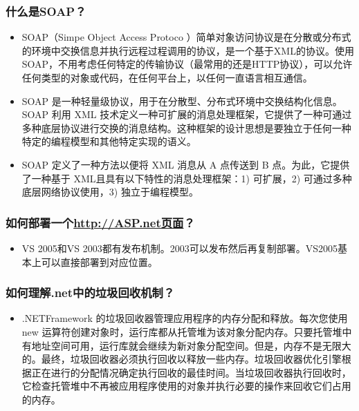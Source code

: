 \documentclass[9pt, b5paper]{article}
\begin{document}
\subsubsection{什么是SOAP？}
\label{sec-1-2-117}
\begin{itemize}
\item SOAP（Simpe Object Access Protoco ）简单对象访问协议是在分散或分布式的环境中交换信息并执行远程过程调用的协议，是一个基于XML的协议。使用SOAP，不用考虑任何特定的传输协议（最常用的还是HTTP协议），可以允许任何类型的对象或代码，在任何平台上，以任何一直语言相互通信。
\item SOAP 是一种轻量级协议，用于在分散型、分布式环境中交换结构化信息。 SOAP 利用 XML 技术定义一种可扩展的消息处理框架，它提供了一种可通过多种底层协议进行交换的消息结构。这种框架的设计思想是要独立于任何一种特定的编程模型和其他特定实现的语义。
\item SOAP 定义了一种方法以便将 XML 消息从 A 点传送到 B 点。为此，它提供了一种基于 XML且具有以下特性的消息处理框架：1) 可扩展，2) 可通过多种底层网络协议使用，3) 独立于编程模型。
\end{itemize}
\subsubsection{如何部署一个\url{http://ASP.net页面}？}
\label{sec-1-2-118}
\begin{itemize}
\item VS 2005和VS 2003都有发布机制。2003可以发布然后再复制部署。VS2005基本上可以直接部署到对应位置。
\end{itemize}
\subsubsection{如何理解.net中的垃圾回收机制？}
\label{sec-1-2-119}
\begin{itemize}
\item .NETFramework 的垃圾回收器管理应用程序的内存分配和释放。每次您使用 new 运算符创建对象时，运行库都从托管堆为该对象分配内存。只要托管堆中有地址空间可用，运行库就会继续为新对象分配空间。但是，内存不是无限大的。最终，垃圾回收器必须执行回收以释放一些内存。垃圾回收器优化引擎根据正在进行的分配情况确定执行回收的最佳时间。当垃圾回收器执行回收时，它检查托管堆中不再被应用程序使用的对象并执行必要的操作来回收它们占用的内存。
\end{itemize}
\end{document}
